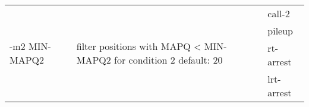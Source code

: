 {\small
\begin{tabular}{@{}p{}p{}l@{}}
\multirow{4}{=}{-m2 MIN-MAPQ2} & \multirow{4}{=}{filter positions with MAPQ < MIN-MAPQ2 for condition 2
default: 20} & call-2 \\
 &  & pileup \\
 &  & rt-arrest \\
 &  & lrt-arrest \\
\end{tabular}\\
}
